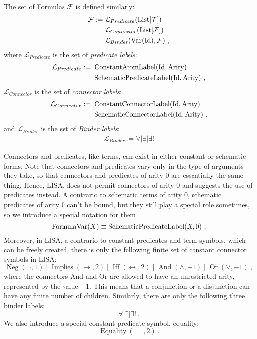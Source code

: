\begin{definition}[Formulas]
  The set of Formulas $\mathcal{F}$ is defined similarly:
  \begin{align}
    \mathcal{F} := & ~\mathcal{L}_{Predicate}(\operatorname{List}[\mathcal{T}])                \\
    \mid           & ~\mathcal{L}_{Connector}(\operatorname{List}[\mathcal{F}])                \\
    \mid           & ~\mathcal{L}_{Binder}(\operatorname{Var}(\textnormal{Id}), \mathcal{F})~,
  \end{align}
  where $\mathcal{L}_{Predicate}$ is the set of \textit{predicate labels}:
  \begin{align}
    \mathcal{L}_{Predicate} := & ~\operatorname{ConstantAtomLabel}(\textnormal{Id}, \textnormal{Arity})    \\
    \mid                       & ~\operatorname{SchematicPredicateLabel}(\textnormal{Id}, \textnormal{Arity})~,
  \end{align}
  $\mathcal{L}_{Connector}$ is the set of \textit{connector labels}:
  \begin{align}
    \mathcal{L}_{Connector} := & ~\operatorname{ConstantConnectorLabel}(\textnormal{Id}, \textnormal{Arity})    \\
    \mid                       & ~\operatorname{SchematicConnectorLabel}(\textnormal{Id}, \textnormal{Arity})~.
  \end{align}
  and $\mathcal{L}_{Binder}$ is the set of \textit{Binder labels}:
  \begin{align}
    \mathcal{L}_{Binder} := \forall \mid \exists \mid \exists!
  \end{align}

  Connectors and predicates, like terms, can exist in either constant or schematic forms. Note that connectors and predicates vary only in the type of arguments they take, so that connectors and predicates of arity 0 are essentially the same thing. Hence, LISA, does not permit connectors of arity 0 and suggests the use of predicates instead.
  A contrario to schematic terms of arity 0, schematic predicates of arity 0 can't be bound, but they still play a special role sometimes, so we introduce a special notation for them
  $$
    \operatorname{FormulaVar}(X) \equiv \operatorname{SchematicPredicateLabel}(X, 0)~.
  $$
  Moreover, in LISA, a contrario to constant predicates and term symbols, which can be freely created, there is only the following finite set of constant connector symbols in LISA:
  $$
    \operatorname{Neg}(\neg, 1)\mid \operatorname{Implies}(\rightarrow, 2)\mid \operatorname{Iff}(\leftrightarrow, 2)\mid \operatorname{And}(\land, -1)\mid \operatorname{Or}(\lor, -1)~,
  $$
  where the connectors And and Or are allowed to have an unrestricted arity, represented by the value $-1$. This means that a conjunction or a disjunction can have any finite number of children.
  Similarly, there are only the following three binder labels:
  $$
    \forall \mid \exists \mid \exists !~.
  $$
  We also introduce a special constant predicate symbol, equality:
  $$
    \operatorname{Equality}(=, 2)~.
  $$
\end{definition}
